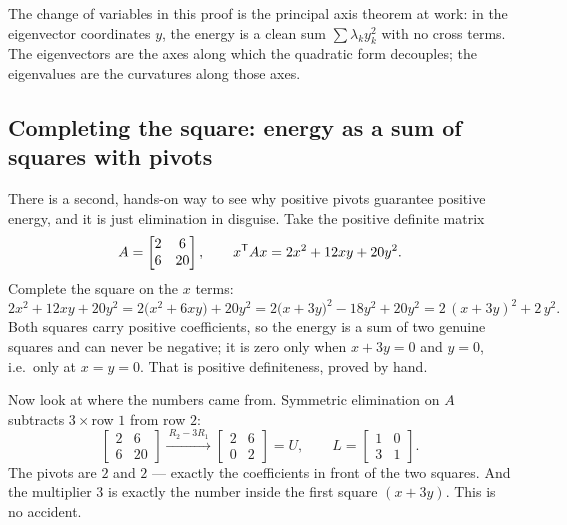 The change of variables in this proof is the principal axis theorem at work: in the eigenvector coordinates $y$, the energy is a clean sum $\sum\lambda_k y_k^2$ with no cross terms. The eigenvectors are the axes along which the quadratic form decouples; the eigenvalues are the curvatures along those axes.

\subsection{Completing the square: energy as a sum of squares with pivots}

There is a second, hands-on way to see why positive pivots guarantee positive energy, and it is just elimination in disguise. Take the positive definite matrix
\[
   A=\begin{bmatrix} 2 & 6\\ 6 & 20\end{bmatrix},
   \qquad
   x^{\mathsf T} A x=2x^2+12xy+20y^2 .
\]
Complete the square on the $x$ terms:
\[
   2x^2+12xy+20y^2
   =2\bigl(x^2+6xy\bigr)+20y^2
   =2\bigl(x+3y\bigr)^2-18y^2+20y^2
   =2\,(x+3y)^2+2\,y^2 .
\]
Both squares carry positive coefficients, so the energy is a sum of two genuine squares and can never be negative; it is zero only when $x+3y=0$ and $y=0$, i.e.\ only at $x=y=0$. That is positive definiteness, proved by hand.

Now look at where the numbers came from. Symmetric elimination on $A$ subtracts $3\times$row $1$ from row $2$:
\[
   \begin{bmatrix} 2 & 6\\ 6 & 20\end{bmatrix}
   \xrightarrow{\ R_2-3R_1\ }
   \begin{bmatrix} 2 & 6\\ 0 & 2\end{bmatrix}
   =U,
   \qquad
   L=\begin{bmatrix} 1 & 0\\ 3 & 1\end{bmatrix}.
\]
The pivots are $2$ and $2$ --- exactly the coefficients in front of the two squares. And the multiplier $3$ is exactly the number inside the first square $(x+3y)$. This is no accident.


